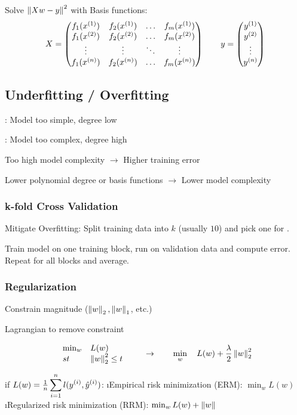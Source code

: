 Solve $\left\lVert Xw-y\right\rVert^2$ with Basis functions:
\[
X = \begin{pmatrix} f_1(x^{(1)}) & f_2(x^{(1)}) & \ldots & f_m(x^{(1)})\\
f_1(x^{(2)}) & f_2(x^{(2)}) & \ldots & f_m(x^{(2)})\\
\vdots & \vdots & \ddots & \vdots\\
f_1(x^{(n)}) & f_2(x^{(n)}) & \ldots & f_m(x^{(n)}) \end{pmatrix} \qquad y = \begin{pmatrix} y^{(1)}\\y^{(2)}\\\vdots\\y^{(n)} \end{pmatrix}
\]

\subsection{Underfitting / Overfitting}

: Model too simple, degree low

: Model too complex, degree high

Too high model complexity $\to$ Higher training error

Lower polynomial degree or basis functions $\to$ Lower model complexity

\subsubsection{k-fold Cross Validation}

Mitigate Overfitting: Split training data into $k$ (usually $10$) and pick one for .

Train model on one training block, run on validation data and compute error. Repeat for all blocks and average.

\subsubsection{Regularization}

Constrain magnitude ($\left\lVert w\right\rVert_2, \left\lVert w\right\rVert_1$, etc.)

Lagrangian to remove constraint

\[
\begin{array}{ll}
  \min_w & L(w) \\
  st & \left\lVert w\right\rVert_2^2 \leq t
\end{array} \qquad \to \qquad \min_w \quad L(w) + \frac{\lambda}{2} \left\lVert w\right\rVert_2^2
\]

if $L(w) = \frac{1}{n} \displaystyle\sum^n_{{i}=1} l(y^{(i)}, \hat y^{(i)})$:
\be
\i Empirical risk minimization (ERM): \qquad $\min_w L(w)$
\i Regularized risk minimization (RRM): \quad $\min_w L(w) + \left\lVert w\right\rVert$
\ee

